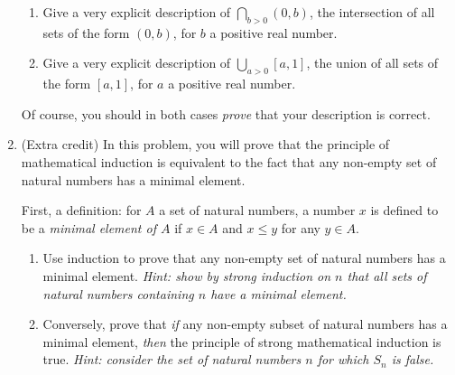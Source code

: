 \documentclass{amsart}
\theoremstyle{definition}
\begin{document}
\begin{enumerate}
    \begin{enumerate}
      \item Give a very explicit description of $\bigcap_{b > 0} (0, b)$, the intersection of all sets of the form $(0, b)$, for $b$ a positive real number. 
      \item Give a very explicit description of $\bigcup_{a > 0} [a, 1]$, the union of all sets of the form $[a, 1]$, for $a$ a positive real number.
    \end{enumerate}

    Of course, you should in both cases \emph{prove} that your description is correct.

  \item (Extra credit) In this problem, you will prove that the principle of mathematical induction is equivalent to the fact that any non-empty set of natural numbers has a minimal element. 

    First, a definition: for $A$ a set of natural numbers, a number $x$ is defined to be a \emph{minimal element of $A$} if $x \in A$ and $x \le y$ for any $y \in A$.

    \begin{enumerate}
    \item Use induction to prove that any non-empty set of natural numbers has a minimal element. \emph{Hint: show by strong induction on $n$ that all sets of natural numbers containing $n$ have a minimal element.}
    \item Conversely, prove that \emph{if} any non-empty subset of natural numbers has a minimal element, \emph{then} the principle of strong mathematical induction is true. \emph{Hint: consider the set of natural numbers $n$ for which $S_n$ is false.}
    \end{enumerate}
\end{enumerate}



\end{document}
